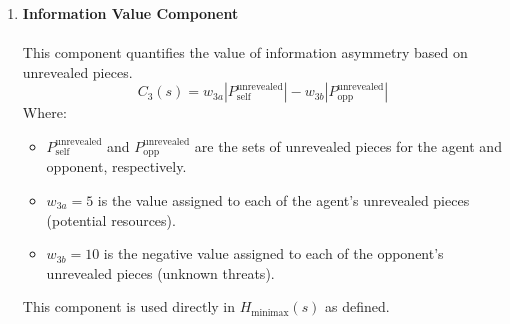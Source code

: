 \documentclass{article}
\begin{document}
\begin{enumerate}
            
    \item  \textbf{Information Value Component}
            \\
            \\
            This component quantifies the value of information asymmetry based on unrevealed pieces.
            \begin{equation}
            \label{eq:minimax_c3}
            C_3(s) = w_{3a} |P_{\text{self}}^{\text{unrevealed}}| - w_{3b} |P_{\text{opp}}^{\text{unrevealed}}|
            \end{equation}
            Where:
            \begin{itemize}
                \item $P_{\text{self}}^{\text{unrevealed}}$ and $P_{\text{opp}}^{\text{unrevealed}}$ are the sets of unrevealed pieces for the agent and opponent, respectively.
                \item $w_{3a} = 5$ is the value assigned to each of the agent's unrevealed pieces (potential resources).
                \item $w_{3b} = 10$ is the negative value assigned to each of the opponent's unrevealed pieces (unknown threats).
            \end{itemize}
            This component is used directly in $H_{\text{minimax}}(s)$ as defined.
            

\end{enumerate}
\end{document}
